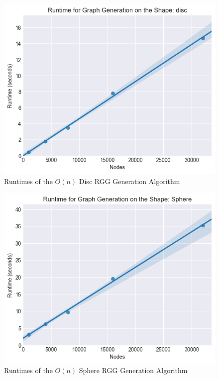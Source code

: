 \documentclass{article}
\begin{document}
  \begin{figure}[H]

    \includegraphics[width=1 \textwidth]{disc/runtime/runtime_chart}
    \caption{Runtimes of the $O(n)$ Disc RGG Generation Algorithm}
  \end{figure}

  \begin{figure}[H]

    \includegraphics[width=1 \textwidth]{sphere/runtime/runtime_chart}
    \caption{Runtimes of the $O(n)$ Sphere RGG Generation Algorithm}
  \end{figure}
\end{document}
